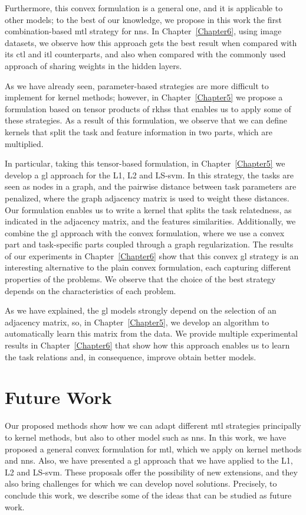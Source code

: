 %
Furthermore, this convex formulation is a general one, and it is applicable to other models; to the best of our knowledge, we propose in this work the first combination-based \acrshort{mtl} strategy for \acrshort{nns}.
%
In Chapter~\ref{Chapter6}, using image datasets, we observe how this approach gets the best result when compared with its \acrshort{ctl} and \acrshort{itl} counterparts, and also when compared with the commonly used approach of sharing weights in the hidden layers.


%
As we have already seen, parameter-based strategies are more difficult to implement for kernel methods; however, in Chapter~\ref{Chapter5} we propose a formulation based on tensor products of \acrfull{rkhss} that enables us to apply some of these strategies.
As a result of this formulation, we observe that we can define kernels that split the task and feature information in two parts, which are multiplied.

In particular, taking this tensor-based formulation, in Chapter~\ref{Chapter5} we develop a \acrfull{gl} approach for the L1, L2 and LS-\acrshort{svm}. In this strategy, the tasks are seen as nodes in a graph, and the pairwise distance between task parameters are penalized, where the graph adjacency matrix is used to weight these distances.
Our formulation enables us to write a kernel that splits the task relatedness, as indicated in the adjacency matrix, and the features similarities.
%
Additionally, we combine the \acrshort{gl} approach with the convex formulation, where we use a convex part and task-specific parts coupled through a graph regularization.
%
The results of our experiments in Chapter~\ref{Chapter6} show that this convex \acrshort{gl} strategy is an interesting alternative to the plain convex formulation, each capturing different properties of the problems. We observe that the choice of the best strategy depends on the characteristics of each problem.

As we have explained, the \acrshort{gl} models strongly depend on the selection of an adjacency matrix, so, in Chapter~\ref{Chapter5}, we develop an algorithm to automatically learn this matrix from the data.
We provide multiple experimental results in Chapter~\ref{Chapter6} that show how this approach enables us to learn the task relations and, in consequence, improve obtain better models.


\section{Future Work}
Our proposed methods show how we can adapt different \acrshort{mtl} strategies principally to kernel methods, but also to other model such as \acrshort{nns}. 
In this work, we have proposed a general convex formulation for \acrshort{mtl}, which we apply on kernel methods and \acrshort{nns}. Also, we have presented a \acrshort{gl} approach that we have applied to the L1, L2 and LS-\acrshort{svm}.
%
These proposals offer the possibility of new extensions, and they also bring challenges for which we can develop novel solutions. Precisely, to conclude this work, we describe some of the ideas that can be studied as future work.


